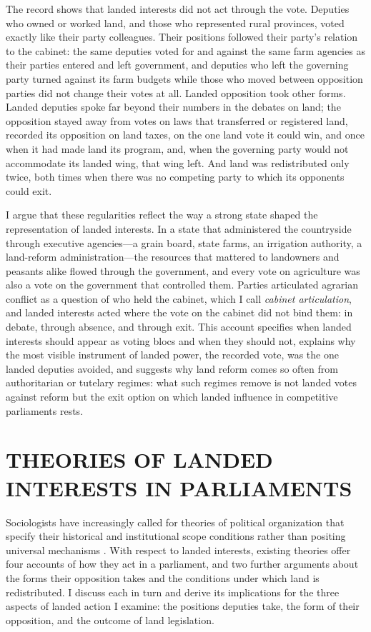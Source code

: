 \documentclass[12pt]{article}
\begin{document}
The record shows that landed interests did not act through the vote. Deputies who owned or worked land, and those who represented rural provinces, voted exactly like their party colleagues. Their positions followed their party's relation to the cabinet: the same deputies voted for and against the same farm agencies as their parties entered and left government, and deputies who left the governing party turned against its farm budgets while those who moved between opposition parties did not change their votes at all. Landed opposition took other forms. Landed deputies spoke far beyond their numbers in the debates on land; the opposition stayed away from votes on laws that transferred or registered land, recorded its opposition on land taxes, on the one land vote it could win, and once when it had made land its program, and, when the governing party would not accommodate its landed wing, that wing left. And land was redistributed only twice, both times when there was no competing party to which its opponents could exit.

I argue that these regularities reflect the way a strong state shaped the representation of landed interests. In a state that administered the countryside through executive agencies---a grain board, state farms, an irrigation authority, a land-reform administration---the resources that mattered to landowners and peasants alike flowed through the government, and every vote on agriculture was also a vote on the government that controlled them. Parties articulated agrarian conflict as a question of who held the cabinet, which I call \emph{cabinet articulation}, and landed interests acted where the vote on the cabinet did not bind them: in debate, through absence, and through exit. This account specifies when landed interests should appear as voting blocs and when they should not, explains why the most visible instrument of landed power, the recorded vote, was the one landed deputies avoided, and suggests why land reform comes so often from authoritarian or tutelary regimes: what such regimes remove is not landed votes against reform but the exit option on which landed influence in competitive parliaments rests.

\section*{THEORIES OF LANDED INTERESTS IN PARLIAMENTS}

Sociologists have increasingly called for theories of political organization that specify their historical and institutional scope conditions rather than positing universal mechanisms \citep{mudge2014}. With respect to landed interests, existing theories offer four accounts of how they act in a parliament, and two further arguments about the forms their opposition takes and the conditions under which land is redistributed. I discuss each in turn and derive its implications for the three aspects of landed action I examine: the positions deputies take, the form of their opposition, and the outcome of land legislation.
\end{document}
